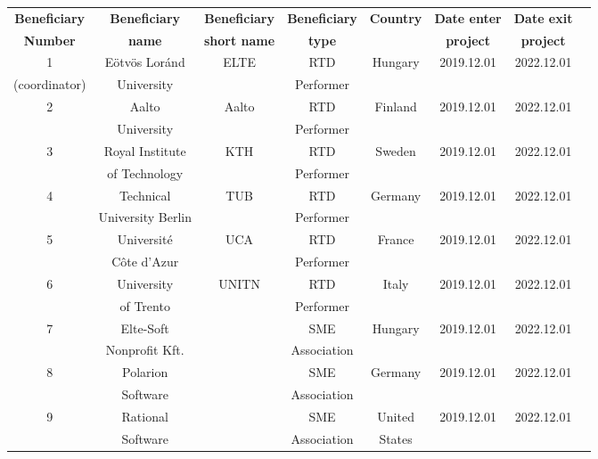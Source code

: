 \usepackage{pbox}






	
	\begin{center}
		\begin{tabular}{ |c|c|c|c|c|c|c|c|} 
			\hline
			\textbf{Beneficiary} & \textbf{Beneficiary} & \textbf{Beneficiary} & \textbf{Beneficiary} & \textbf{Country} & \textbf{Date enter} & \textbf{Date exit} \\
			\textbf{Number} & \textbf{name} & \textbf{short name} & \textbf{type} & ~ & \textbf{project} & \textbf{project} \\
			\hline
			
			1 & Eötvös Loránd & ELTE & RTD & Hungary & 2019.12.01 & 2022.12.01 \\
			(coordinator) & University & ~ & Performer & ~ & ~ & ~ \\
			\hline
			
			2 & Aalto & Aalto & RTD  & Finland & 2019.12.01 & 2022.12.01 \\
			~ & University & ~ & Performer & ~ & ~ & ~ \\
			\hline
			
			3 & Royal Institute & KTH & RTD  & Sweden & 2019.12.01 & 2022.12.01 \\
			~ & of Technology &  ~ & Performer & ~ & ~ & ~ \\
			\hline
			
			4 & Technical & TUB & RTD  & Germany & 2019.12.01 & 2022.12.01 \\
			~ & University Berlin &  ~ & Performer & ~ & ~ & ~ \\
			\hline
			
			5 & Université & UCA & RTD  & France & 2019.12.01 & 2022.12.01 \\
			~ & Côte d’Azur &  ~ & Performer & ~ & ~ & ~ \\
			\hline
			
			6 & University & UNITN & RTD  & Italy & 2019.12.01 & 2022.12.01 \\
			~ & of Trento &  ~ & Performer & ~ & ~ & ~ \\
			\hline
			
			7 & Elte-Soft & ~ & SME  & Hungary & 2019.12.01 & 2022.12.01 \\
			~ & Nonprofit Kft. &  ~ & Association & ~ & ~ & ~ \\
			\hline
			
			8 & Polarion & ~ & SME  & Germany & 2019.12.01 & 2022.12.01 \\
			~ & Software &  ~ & Association & ~ & ~ & ~ \\
			\hline
			
			9 & Rational & ~ & SME & United & 2019.12.01 & 2022.12.01 \\
			~ & Software &  ~ & Association & States & ~ & ~ \\
			\hline
		\end{tabular}
	\end{center}
	
